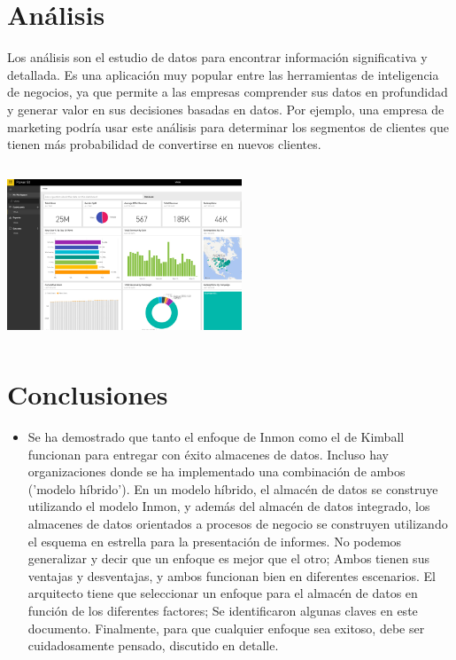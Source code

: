 \documentclass[twoside,twocolumn]{article}
\begin{document}
\section{Análisis}



    Los análisis son el estudio de datos para encontrar información significativa y detallada. Es una aplicación muy popular entre las herramientas de inteligencia de negocios, ya que permite a las empresas comprender sus datos en profundidad y generar valor en sus decisiones basadas en datos. Por ejemplo, una empresa de marketing podría usar este análisis para determinar los segmentos de clientes que tienen más probabilidad de convertirse en nuevos clientes.
    \\ \\
\includegraphics[width=7cm, height=5cm]{Imagenes/linea_bi1}
    


\newpage
\section{Conclusiones}
\begin{itemize}	
\item Se ha demostrado que tanto el enfoque de Inmon como el de Kimball funcionan para entregar con éxito almacenes de datos. Incluso hay organizaciones donde se ha implementado una combinación de ambos ('modelo híbrido'). En un modelo híbrido, el almacén de datos se construye utilizando el modelo Inmon, y además del almacén de datos integrado, los almacenes de datos orientados a procesos de negocio se construyen utilizando el esquema en estrella para la presentación de informes. No podemos generalizar y decir que un enfoque es mejor que el otro; Ambos tienen sus ventajas y desventajas, y ambos funcionan bien en diferentes escenarios. El arquitecto tiene que seleccionar un enfoque para el almacén de datos en función de los diferentes factores; Se identificaron algunas claves en este documento. Finalmente, para que cualquier enfoque sea exitoso, debe ser cuidadosamente pensado, discutido en detalle. 

\end{itemize} 
\end{document}

